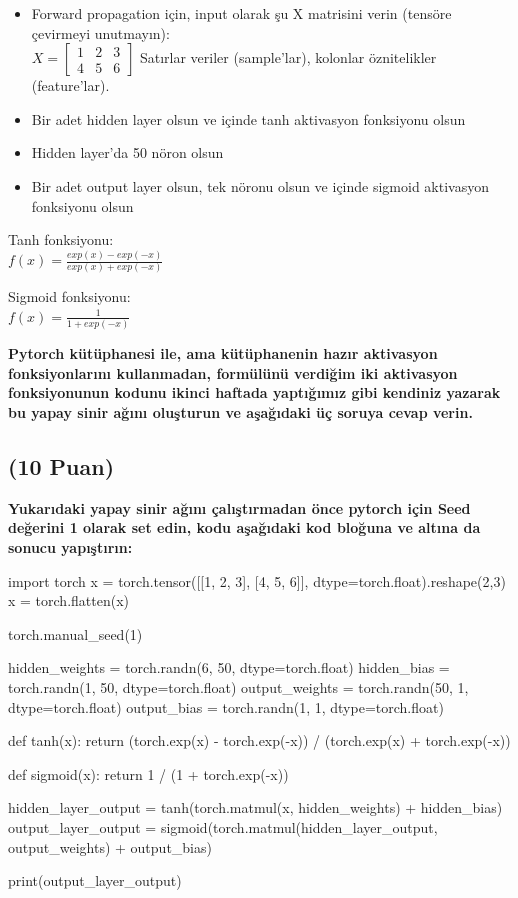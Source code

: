\documentclass[11pt]{article}
\begin{document}
\begin{itemize}
    \item Forward propagation için, input olarak şu X matrisini verin (tensöre çevirmeyi unutmayın):\\
    $X = \begin{bmatrix}
        1 & 2 & 3\\
        4 & 5 & 6
        \end{bmatrix}$
    Satırlar veriler (sample'lar), kolonlar öznitelikler (feature'lar).
    \item Bir adet hidden layer olsun ve içinde tanh aktivasyon fonksiyonu olsun
    \item Hidden layer'da 50 nöron olsun
    \item Bir adet output layer olsun, tek nöronu olsun ve içinde sigmoid aktivasyon fonksiyonu olsun
\end{itemize}

Tanh fonksiyonu:\\
$f(x) = \frac{exp(x) - exp(-x)}{exp(x) + exp(-x)}$
\vspace{.2in}

Sigmoid fonksiyonu:\\
$f(x) = \frac{1}{1 + exp(-x)}$

\vspace{.2in}
 \textbf{Pytorch kütüphanesi ile, ama kütüphanenin hazır aktivasyon fonksiyonlarını kullanmadan, formülünü verdiğim iki aktivasyon fonksiyonunun kodunu ikinci haftada yaptığımız gibi kendiniz yazarak bu yapay sinir ağını oluşturun ve aşağıdaki üç soruya cevap verin.}
 
\subsection{(10 Puan)} \textbf{Yukarıdaki yapay sinir ağını çalıştırmadan önce pytorch için Seed değerini 1 olarak set edin, kodu aşağıdaki kod bloğuna ve altına da sonucu yapıştırın:}

\begin{python}
import torch 
x = torch.tensor([[1, 2, 3], [4, 5, 6]], dtype=torch.float).reshape(2,3)
x = torch.flatten(x)

torch.manual_seed(1)

hidden_weights = torch.randn(6, 50, dtype=torch.float)
hidden_bias = torch.randn(1, 50, dtype=torch.float)
output_weights = torch.randn(50, 1, dtype=torch.float)
output_bias = torch.randn(1, 1, dtype=torch.float)

def tanh(x):
    return (torch.exp(x) - torch.exp(-x)) / (torch.exp(x) + torch.exp(-x))

def sigmoid(x):
    return 1 / (1 + torch.exp(-x))

hidden_layer_output = tanh(torch.matmul(x, hidden_weights) + hidden_bias)
output_layer_output = sigmoid(torch.matmul(hidden_layer_output, output_weights) + output_bias)

print(output_layer_output)
\end{python}
\end{document}
